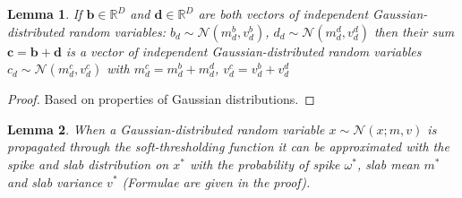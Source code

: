 \documentclass[letterpaper]{article}
\newtheorem{lemma}{Lemma}
\begin{document}
\begin{lemma}
\label{thm:sum_vectors}
If $\mathbf{b} \in \mathbb{R}^{D}$ and $\mathbf{d} \in \mathbb{R}^{D}$ are both vectors of independent Gaussian-distributed random variables: $b_{d} \sim \mathcal{N}(m^b_{d}, v^b_{d})$, $d_{d} \sim \mathcal{N}(m^d_{d}, v^d_{d})$ then their sum $\mathbf{c} = \mathbf{b} + \mathbf{d}$ is a vector of independent Gaussian-distributed random variables $c_{d} \sim \mathcal{N}(m^c_{d}, v^c_{d})$ with $m^c_{d} = m^b_{d} + m^d_{d}$, $v^c_{d} = v^b_{d} + v^d_{d}$
\end{lemma}
\begin{proof}
Based on properties of Gaussian distributions.
\end{proof}

\begin{lemma}
\label{thm:soft_thresholding}
When a Gaussian-distributed random variable $x \sim \mathcal{N}(x; m, v)$ is propagated through the soft-thresholding function it can be approximated with the spike and slab distribution on $x^*$ with the probability of spike $\omega^*$, slab mean $m^*$ and slab variance $v^*$ (Formulae are given in the proof).
\end{lemma}
\end{document}
